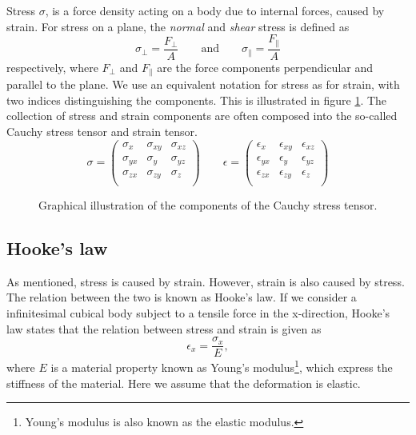 \documentclass[twoside,english]{uiofysmaster}
\begin{document}
Stress $\sigma$, is a force density acting on a body due to internal forces, caused by strain.
For stress on a plane, the \textit{normal} and \textit{shear} stress is defined as
\begin{equation}
	\sigma_\perp = \frac{F_\perp}{A} \qquad \text{and} \qquad \sigma_\parallel = \frac{F_\parallel}{A}
\end{equation}
respectively, where $F_\perp$ and $F_\parallel$ are the force components perpendicular and parallel to the plane.
We use an equivalent notation for stress as for strain, with two indices distinguishing the components.
This is illustrated in figure \ref{fig:stressTensor}.
The collection of stress and strain components are often composed into the so-called Cauchy stress tensor and strain tensor.
\begin{equation}
\sigma = 
\begin{pmatrix}
\sigma_{x} & \sigma_{xy} & \sigma_{xz} \\
\sigma_{yx} & \sigma_{y} & \sigma_{yz} \\
\sigma_{zx} & \sigma_{zy} & \sigma_{z} \\
\end{pmatrix}
\qquad
\epsilon = 
\begin{pmatrix}
\epsilon_{x} & \epsilon_{xy} & \epsilon_{xz} \\
\epsilon_{yx} & \epsilon_{y} & \epsilon_{yz} \\
\epsilon_{zx} & \epsilon_{zy} & \epsilon_{z} \\
\end{pmatrix}
\end{equation}

\begin{figure}
	\center
	\resizebox{0.5\linewidth}{!}{
		
	}
	\caption{Graphical illustration of the components of the Cauchy stress tensor.}
	\label{fig:stressTensor}
\end{figure}


\subsection{Hooke's law}
As mentioned, stress is caused by strain. However, strain is also caused by stress. 
The relation between the two is known as Hooke's law. 
If we consider a infinitesimal cubical body subject to a tensile force in the x-direction, Hooke's law states that the relation between stress and strain is given as
\begin{equation}
	\epsilon_x = \frac{\sigma_x}{E},
\end{equation}
where $E$ is a material property known as Young's modulus\footnote{Young's modulus is also known as the elastic modulus.}, which express the stiffness of the material. 
Here we assume that the deformation is elastic.
\end{document}
